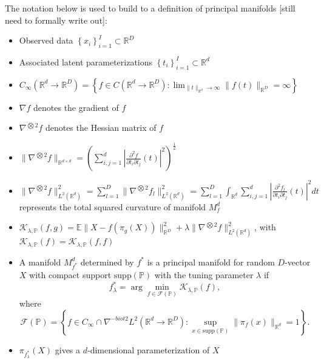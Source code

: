 \documentclass[11pt,reqno]{article}
\begin{document}
The notation below is used to build to a definition of principal manifolds [still need to formally write out]:
\begin{itemize}
  \item Observed data $\left\{x_i\right\}_{i=1}^I \subset \mathbb{R}^D$
  \item Associated latent parameterizations $\left\{t_i\right\}_{i=1}^I \subset \mathbb{R}^d$
  \item $C_{\infty}\left(\mathbb{R}^d \to \mathbb{R}^D\right) = \left\{f \in C(\mathbb{R}^d \to \mathbb{R}^D): \lim_{\|t\|_{\mathbb{R}^d} \to \infty} \|f(t)\|_{\mathbb{R}^D} = \infty\right\}$ 
  \item $\nabla f$ denotes the gradient of $f$
  \item $\nabla^{\bigotimes 2}f$ denotes the Hessian matrix of $f$
  \item $\|\nabla^{\bigotimes 2}f\|_{\mathbb{R}^{d \times d}} = \left(\sum_{i, j = 1}^{d} |\frac{\partial^2f}{\partial t_i \partial t_j}(t)|^2\right)^{\frac{1}{2}}$
  \item $\|\nabla^{\bigotimes 2}f\|_{L^2(\mathbb{R}^{d})}^2 = \sum_{l = 1}^{D}\|\nabla^{\bigotimes 2}f_l\|_{L^2(\mathbb{R}^{d})}^2 = \sum_{l=1}^{D}\int_{\mathbb{R}^d}\sum_{i,j = 1}^{d}|\frac{\partial^2f_l}{\partial t_i \partial t_j}(t)|^2dt$ represents the total squared curvature of manifold $M_f^{d}$
  \item $\mathcal{K}_{\lambda, \mathbb{P}}(f, g) = \mathbb{E}\|X - f(\pi_{g}(X))\|_{\mathbb{R}^{D}}^2 + \lambda\|\nabla^{\bigotimes 2}f\|_{L^2(\mathbb{R}^{d})}^2$, with $\mathcal{K_{\lambda, \mathbb{P}}}(f) = \mathcal{K}_{\lambda, \mathbb{P}}(f, f)$
  \item A manifold $M_{f^*}^{d}$ determined by $f^*$ is a principal manifold for random $D$-vector $X$ with compact support $\text{supp}(\mathbb{P})$ with the tuning parameter $\lambda$ if \[%
    f_{\lambda}^{*} = \arg \min_{f \in \mathcal{F}(\mathbb{P})}\mathcal{K}_{\lambda, \mathbb{P}}(f)
  ,\]%
    where \[%
      \mathcal{F}(\mathbb{P}) = \left\{f \in C_{\infty} \cap \nabla^{-biot 2}L^2(\mathbb{R}^{d} \to \mathbb{R}^{D}): \sup_{x \in \text{supp}(\mathbb{P})}\|\pi_f(x)\|_{\mathbb{R}^{d}} = 1\right\}
    .\]%
  \item $\pi_{f_\lambda^{*}}(X)$ gives a $d$-dimensional parameterization of $X$
\end{itemize}
\end{document}
